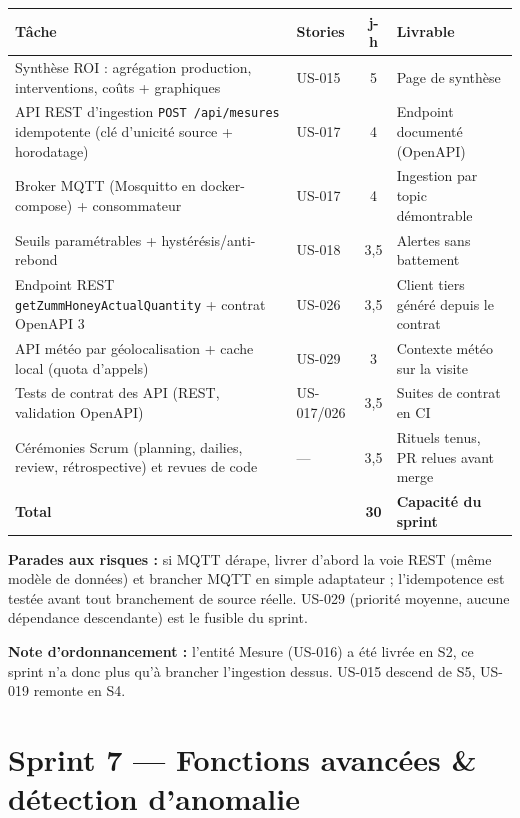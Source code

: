 \begin{center}
\small
\begin{tabular}{p{7.2cm}lcp{4.6cm}}
\toprule
\textbf{Tâche} & \textbf{Stories} & \textbf{j-h} & \textbf{Livrable} \\
\midrule
Synthèse ROI : agrégation production, interventions, coûts
+ graphiques & US-015 & 5 & Page de synthèse \\
API REST d'ingestion \texttt{POST /api/mesures} idempotente
(clé d'unicité source + horodatage) & US-017 & 4 & Endpoint documenté (OpenAPI) \\
Broker MQTT (Mosquitto en docker-compose) + consommateur & US-017 & 4 & Ingestion par topic démontrable \\
Seuils paramétrables + hystérésis/anti-rebond & US-018 & 3,5 & Alertes sans battement \\
Endpoint REST \texttt{getZummHoneyActualQuantity} + contrat OpenAPI 3 & US-026 & 3,5 & Client tiers généré depuis le contrat \\
API météo par géolocalisation + cache local (quota d'appels) & US-029 & 3 & Contexte météo sur la visite \\
Tests de contrat des API (REST, validation OpenAPI) & US-017/026 & 3,5 & Suites de contrat en CI \\
\addlinespace
Cérémonies Scrum (planning, dailies, review, rétrospective) et
revues de code & --- & 3,5 & Rituels tenus, PR relues avant merge \\
\midrule
\textbf{Total} & & \textbf{30} & \textbf{Capacité du sprint} \\
\bottomrule
\end{tabular}
\end{center}

\textbf{Parades aux risques :} si MQTT dérape, livrer d'abord la voie REST
(même modèle de données) et brancher MQTT en simple adaptateur ;
l'idempotence est testée avant tout branchement de source réelle. US-029
(priorité moyenne, aucune dépendance descendante) est le fusible du sprint.

\textbf{Note d'ordonnancement :} l'entité Mesure (US-016) a été livrée en S2,
ce sprint n'a donc plus qu'à brancher l'ingestion dessus. US-015 descend de
S5, US-019 remonte en S4.

\section{Sprint 7 --- Fonctions avancées \& détection d'anomalie}

